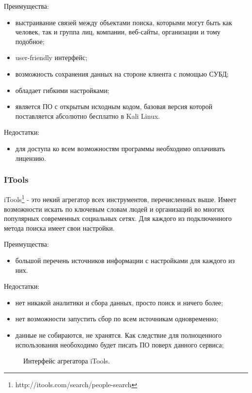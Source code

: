 Преимущества:
\begin{itemize}
    \item выстраивание связей между объектами поиска, которыми могут быть как человек, так и группа лиц, компании, веб-сайты,
    организации и тому подобное;
    \item user-friendly интерфейс;
    \item возможность сохранения данных на стороне клиента с помощью СУБД;
    \item обладает гибкими настройками;
    \item является ПО с открытым исходным кодом, базовая версия которой поставляется абсолютно бесплатно в Kali Linux.
\end{itemize}

Недостатки:
\begin{itemize}
    \item для доступа ко всем возможностям программы необходимо оплачивать лицензию.
\end{itemize}


\subsubsection{ITools}
iTools\footnote{http://itools.com/search/people-search} - это некий агрегатор всех инструментов, перечисленных выше. Имеет
возможности искать по ключевым словам людей и организаций во многих популярных современных социальных сетях. Для каждого из
подключенного метода поиска имеет свои настройки.

Преимущества:
\begin{itemize}
    \item большой перечень источников информации с настройками для каждого из них.
\end{itemize}

Недостатки:
\begin{itemize}
    \item нет никакой аналитики и сбора данных, просто поиск и ничего более;
    \item нет возможности запустить сбор по всем источникам одновременно;
    \item данные не собираются, не хранятся. Как следствие для полноценного использования необоходимо будет писать ПО поверх
    данного сервиса;
\end{itemize}

\begin{figure}[H]
    \caption{Интерфейс агрегатора iTools.}
    \label{ris:image}
\end{figure}

